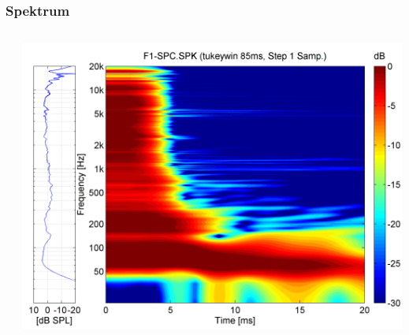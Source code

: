%
%
%
\bgroup
\begin{frame}[t]
\setlength{\abovedisplayskip}{5pt}
\setlength{\belowdisplayskip}{5pt}
\frametitle{Spektrum}
\vspace{-5pt}
\begin{columns}[t,onlytextwidth]
\begin{column}{0.18\textwidth}
\end{column}
\begin{column}{0.78\textwidth}
\includegraphics[width=\textwidth]{../slides/0/Bose-F1-Spektrogramm.png}
\end{column}
\end{columns}
\end{frame}
\egroup
